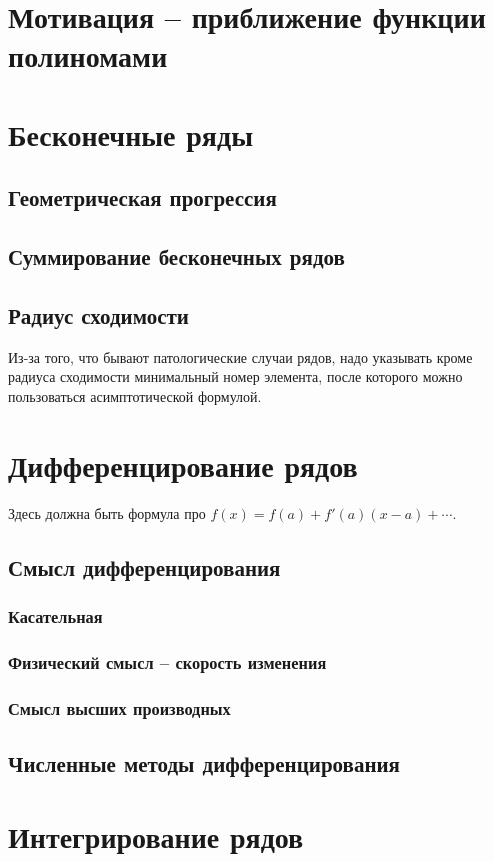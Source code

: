 \documentclass{article}
\begin{document}
\section{Мотивация -- приближение функции полиномами}
\section{Бесконечные ряды }
\subsection{Геометрическая прогрессия}
\subsection{Суммирование бесконечных рядов}
\subsection{Радиус сходимости}
Из-за того, что бывают патологические случаи рядов, надо указывать кроме радиуса сходимости минимальный номер элемента, после которого можно пользоваться асимптотической формулой.
\section{Дифференцирование рядов}
Здесь должна быть формула про $f(x)=f(a)+f'(a)(x-a)+\cdots$.
\subsection{Смысл дифференцирования}
\subsubsection{Касательная}
\subsubsection{Физический смысл -- скорость изменения}
\subsubsection{Смысл высших производных}
\subsection{Численные методы дифференцирования}
\section{Интегрирование рядов}
\end{document}
